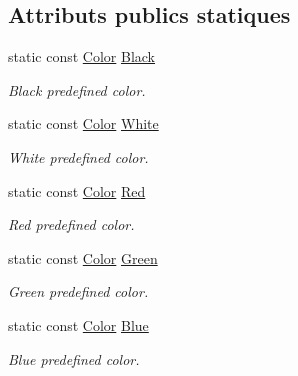 \subsection*{Attributs publics statiques}
\begin{DoxyCompactItemize}
\item 
\mbox{\label{classsf_1_1Color_a77c688197b981338f0b19dc58bd2facd}} 
static const \hyperlink{classsf_1_1Color}{Color} \hyperlink{classsf_1_1Color_a77c688197b981338f0b19dc58bd2facd}{Black}
\begin{DoxyCompactList}\small\item\em Black predefined color. \end{DoxyCompactList}\item 
\mbox{\label{classsf_1_1Color_a4fd874712178d9e206f53226002aa4ca}} 
static const \hyperlink{classsf_1_1Color}{Color} \hyperlink{classsf_1_1Color_a4fd874712178d9e206f53226002aa4ca}{White}
\begin{DoxyCompactList}\small\item\em White predefined color. \end{DoxyCompactList}\item 
\mbox{\label{classsf_1_1Color_a127dbf55db9c07d0fa8f4bfcbb97594a}} 
static const \hyperlink{classsf_1_1Color}{Color} \hyperlink{classsf_1_1Color_a127dbf55db9c07d0fa8f4bfcbb97594a}{Red}
\begin{DoxyCompactList}\small\item\em Red predefined color. \end{DoxyCompactList}\item 
\mbox{\label{classsf_1_1Color_a95629b30de8c6856aa7d3afed12eb865}} 
static const \hyperlink{classsf_1_1Color}{Color} \hyperlink{classsf_1_1Color_a95629b30de8c6856aa7d3afed12eb865}{Green}
\begin{DoxyCompactList}\small\item\em Green predefined color. \end{DoxyCompactList}\item 
\mbox{\label{classsf_1_1Color_ab03770d4817426b2614cfc33cf0e245c}} 
static const \hyperlink{classsf_1_1Color}{Color} \hyperlink{classsf_1_1Color_ab03770d4817426b2614cfc33cf0e245c}{Blue}
\begin{DoxyCompactList}\small\item\em Blue predefined color. \end{DoxyCompactList}\item 

\end{DoxyCompactItemize}
